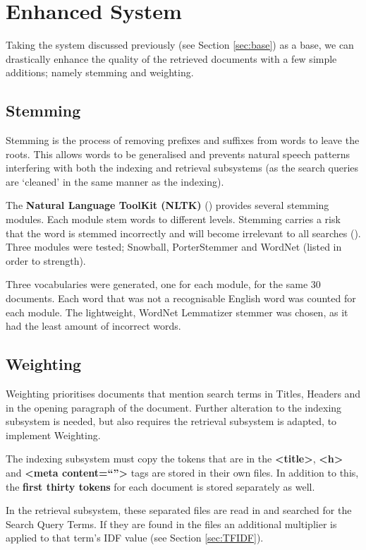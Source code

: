\documentclass{sig-alternate}
\begin{document}
	\section{Enhanced System} \label{sec:enh}
	Taking the system discussed previously (see Section \ref{sec:base}) as a base, we can drastically enhance the quality of the retrieved documents with a few simple additions; namely stemming and weighting. 
	
		\subsection{Stemming} \label{sec:enh-stemming}
		Stemming is the process of removing prefixes and suffixes from words to leave the roots. This allows words to be generalised and prevents natural speech patterns interfering with both the indexing and retrieval subsystems (as the search queries are `cleaned' in the same manner as the indexing).
		
		The \textbf{Natural Language ToolKit (NLTK)} (\cite{NLTK}) provides several stemming modules. Each module stem words to different levels. Stemming carries a risk that the word is stemmed incorrectly and will become irrelevant to all searches (\cite{stemming}). Three modules were tested; Snowball, PorterStemmer and WordNet (listed in order to strength). 
		
		Three vocabularies were generated, one for each module, for the same 30 documents. Each word that was not a recognisable English word was counted for each module. The lightweight, WordNet Lemmatizer stemmer was chosen, as it had the least amount of incorrect words.
		
		\subsection{Weighting} \label{sec:enh-weighting}
		Weighting prioritises documents that mention search terms in Titles, Headers and in the opening paragraph of the document. Further alteration to the indexing subsystem is needed, but also requires the retrieval subsystem is adapted, to implement Weighting.
		
		The indexing subsystem must copy the tokens that are in the \textbf{<title>}, \textbf{<h>} and \textbf{<meta content=``''>} tags are stored in their own files. In addition to this, the \textbf{first thirty tokens} for each document is stored separately as well. 
		
		In the retrieval subsystem, these separated files are read in and searched for the Search Query Terms. If they are found in the files an additional multiplier is applied to that term's IDF value (see Section \ref{sec:TFIDF}).
	
\end{document}
